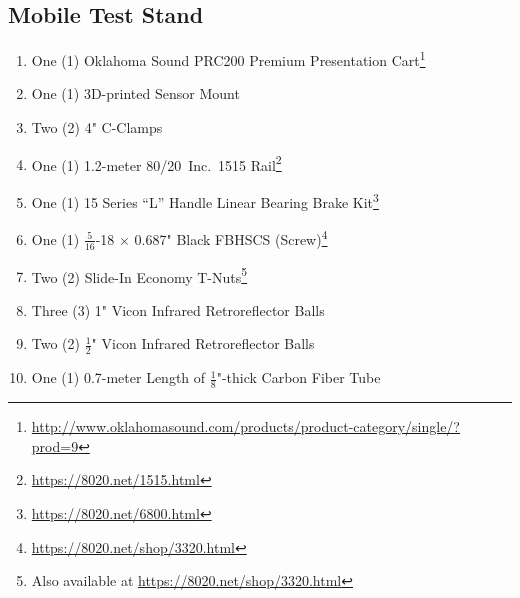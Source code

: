 \subsection{Mobile Test Stand}
\begin{enumerate}
\item One (1) Oklahoma Sound PRC200 Premium Presentation Cart\footnote{\url{http://www.oklahomasound.com/products/product-category/single/?prod=9}}
\item One (1) 3D-printed Sensor Mount
\item Two (2) 4" C-Clamps
\item One (1) 1.2-meter 80/20\textsuperscript{\textregistered}~Inc.\ 1515 Rail\footnote{\url{https://8020.net/1515.html}}
\item One (1) 15 Series ``L'' Handle Linear Bearing Brake Kit\footnote{\url{https://8020.net/6800.html}}
\item One (1) $\frac{5}{16}$-18 $\times$ 0.687" Black FBHSCS (Screw)\footnote{\url{https://8020.net/shop/3320.html}}
\item Two (2) Slide-In Economy T-Nuts\footnote{Also available at \url{https://8020.net/shop/3320.html}}
\item Three (3) 1" Vicon Infrared Retroreflector Balls
\item Two (2) $\frac{1}{2}$" Vicon Infrared Retroreflector Balls
\item One (1) 0.7-meter Length of $\frac{1}{8}$"-thick Carbon Fiber Tube
\end{enumerate}
\pagebreak